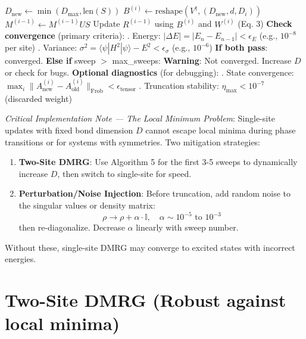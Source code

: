 \documentclass[aps,prb,onecolumn,scriptaddress]{revtex4-2}
\newcommand{\ket}[1]{|#1\rangle}
\newcommand{\bra}[1]{\langle#1|}
\newcommand{\eps}{\epsilon}
\begin{document}
\begin{algorithm}[H]
\begin{algorithmic}[1]
		\State $D_{\text{new}} \gets \min(D_{\max}, \text{len}(S))$
		\State $B^{(i)} \gets \text{reshape}(V^\dagger, (D_{\text{new}}, d, D_i))$
		\State $M^{(i-1)} \gets M^{(i-1)}US$ 
		\State Update $R^{(i-1)}$ using $B^{(i)}$ and $W^{(i)}$ (Eq. 3)
		\EndFor
		\State \textbf{Check convergence} (primary criteria):
		\State {}. Energy: $|\Delta E| = |E_n - E_{n-1}| < \eps_E$ (e.g., $10^{-8}$ per site)
		\State {}. Variance: $\sigma^2 = \bra{\psi}H^2\ket{\psi} - E^2 < \eps_{\sigma}$ (e.g., $10^{-6}$)
		\State \textbf{If both pass}: converged. \textbf{Else if} sweep $>$ max\_sweeps: 
		\State \quad \textbf{Warning}: Not converged. Increase $D$ or check for bugs.
		\State \textbf{Optional diagnostics} (for debugging):
		\State {}. State convergence: $\max_i \|A^{(i)}_{\text{new}} - A^{(i)}_{\text{old}}\|_{\text{Frob}} < \eps_{\text{tensor}}$
		\State {}. Truncation stability: $\eta_{\text{max}} < 10^{-7}$ (discarded weight)
		\EndWhile
	\end{algorithmic}
\end{algorithm}

\textit{Critical Implementation Note — The Local Minimum Problem}:
Single-site updates with fixed bond dimension $D$ cannot escape local minima during phase transitions or for systems with symmetries. Two mitigation strategies:
\begin{enumerate}
	\item \textbf{Two-Site DMRG}: Use Algorithm 5 for the first 3-5 sweeps to dynamically increase $D$, then switch to single-site for speed.
	\item \textbf{Perturbation/Noise Injection}: Before truncation, add random noise to the singular values or density matrix:
	\begin{equation}
		\rho \to \rho + \alpha \cdot \mathbb{I}, \quad \alpha \sim 10^{-5} \text{ to } 10^{-3}
	\end{equation}
	then re-diagonalize. Decrease $\alpha$ linearly with sweep number.
\end{enumerate}
Without these, single-site DMRG may converge to excited states with incorrect energies.

\section{Two-Site DMRG (Robust against local minima)}
\end{document}
